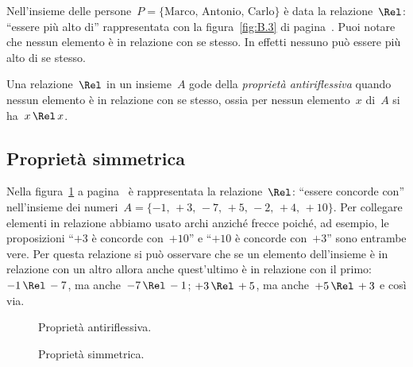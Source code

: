 \begin{exrig}
 \begin{esempio}
Nell'insieme delle persone~$P = \{\text{Marco, Antonio, Carlo}\}$ è data la relazione~$\Rel$: ``essere più alto di''
rappresentata con la figura~\ref{fig:B.3} di pagina~\pageref{fig:B.3}.
Puoi notare che nessun elemento è in relazione con se stesso. In effetti nessuno può essere più alto di se stesso.

 \end{esempio}
\end{exrig}

\begin{definizione}
Una relazione~$\Rel$ in un insieme~$A$ gode della \emph{proprietà antiriflessiva} quando nessun elemento è in relazione con se stesso,
ossia per nessun elemento~$x$ di~$A$ si ha~$x \,\Rel\, x$.
\end{definizione}

\ovalbox{\risolvi \ref{ese:B.20}}
\subsection{Proprietà simmetrica}

\begin{exrig}
 \begin{esempio}
Nella figura~\ref{fig:B.4} a pagina~\pageref{fig:B.4} è rappresentata la relazione~$\Rel$: ``essere concorde con'' nell'insieme dei numeri~$A = \{-1\text{, }+3\text{, }-7\text{, }+5\text{, }-2\text{, }+4\text{, }+10\}$.
Per collegare elementi in relazione abbiamo usato archi anziché frecce poiché, ad esempio, le proposizioni ``$+3$ è concorde con~$+10$'' e ``$+10$ è concorde con~$+3$''
sono entrambe vere. Per questa relazione si può osservare che se un elemento dell'insieme è in relazione con un altro allora anche quest'ultimo è in relazione con il primo:
$-1 \,\Rel\, -7$, ma anche~$-7 \,\Rel\, -1$; $+3 \,\Rel\, +5$, ma anche~$+5 \,\Rel\, +3$ e così via.
 \end{esempio}
\end{exrig}

\begin{figure}[ht]
\begin{minipage}[t]{.45\textwidth}
 \centering
 
 \caption{Proprietà antiriflessiva.}\label{fig:B.3}
\end{minipage}\hfil
\begin{minipage}[t]{.45\textwidth}
 \centering
 
 \caption{Proprietà simmetrica.}\label{fig:B.4}
\end{minipage}
\end{figure}

